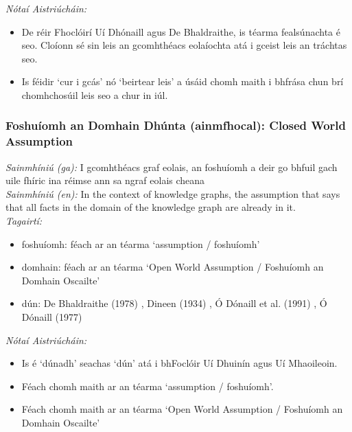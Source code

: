  \noindent \textit{Nótaí Aistriúcháin:}
\begin{itemize}
	\item De réir Fhoclóirí Uí Dhónaill agus De Bhaldraithe, is téarma fealsúnachta é seo. Cloíonn sé sin leis an gcomhthéacs eolaíochta atá i gceist leis an tráchtas seo.
	\item Is féidir `cur i gcás' nó `beirtear leis' a úsáid chomh maith i bhfrása chun brí chomhchosúil leis seo a chur in iúl.
\end{itemize}


\subsubsection*{Foshuíomh an Domhain Dhúnta (ainmfhocal): Closed World Assumption}
 \noindent \textit{Sainmhíniú (ga):} I gcomhthéacs graf eolais, an foshuíomh a deir go bhfuil gach uile fhíric ina réimse ann sa ngraf eolais cheana
\\
 \noindent \textit{Sainmhíniú (en):} In the context of knowledge graphs, the assumption that says that all facts in the domain of the knowledge graph are already in it.
\\
 \noindent \textit{Tagairtí:}
\begin{itemize}
	\item foshuíomh: féach ar an téarma `assumption / foshuíomh'
	\item domhain: féach ar an téarma `Open World Assumption / Foshuíomh an Domhain Oscailte'
	\item dún: De Bhaldraithe (1978) \cite{de-bhaldraithe}, Dineen (1934) \cite{dineen}, Ó Dónaill et al. (1991) \cite{focloir-beag}, Ó Dónaill (1977) \cite{odonaill}
\end{itemize}

 \noindent \textit{Nótaí Aistriúcháin:}
\begin{itemize}
	\item Is é `dúnadh' seachas `dún' atá i bhFoclóir Uí Dhuinín agus Uí Mhaoileoin.
	\item Féach chomh maith ar an téarma `assumption / foshuíomh'.
	\item Féach chomh maith ar an téarma `Open World Assumption / Foshuíomh an Domhain Oscailte'
\end{itemize}


